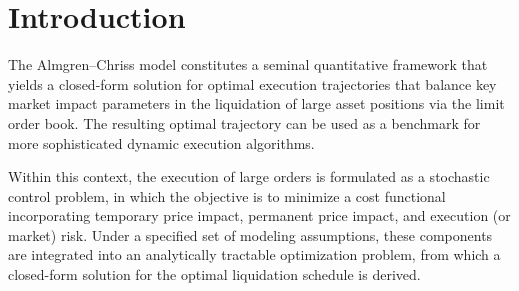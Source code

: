 \section*{Introduction}
The Almgren–Chriss model \cite{online:orderbook-optimal-liquidation} constitutes a seminal quantitative framework that yields a closed-form solution for optimal execution trajectories that balance key market impact parameters in the liquidation of large asset positions via the limit order book. The resulting optimal trajectory can be used as a benchmark for more sophisticated dynamic execution algorithms.

Within this context, the execution of large orders is formulated as a stochastic control problem, in which the objective is to minimize a cost functional incorporating temporary price impact, permanent price impact, and execution (or market) risk. Under a specified set of modeling assumptions, these components are integrated into an analytically tractable optimization problem, from which a closed-form solution for the optimal liquidation schedule is derived.